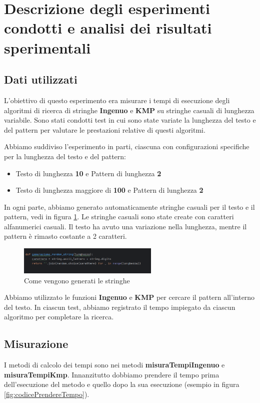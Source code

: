 \newpage
\section{Descrizione degli esperimenti condotti e analisi dei risultati sperimentali}

\subsection{Dati utilizzati}
\label{sec:DatiUtilizzati_1}
L'obiettivo di questo esperimento era misurare i tempi di esecuzione degli algoritmi di ricerca di stringhe \textbf{Ingenuo} e \textbf{KMP} su stringhe casuali di lunghezza variabile. Sono stati condotti test in cui sono state variate la lunghezza del testo e del pattern per valutare le prestazioni relative di questi algoritmi.

Abbiamo suddiviso l'esperimento in parti, ciascuna con configurazioni specifiche per la lunghezza del testo e del pattern:

\begin{itemize}
    \item Testo di lunghezza \textbf{10} e Pattern di lunghezza \textbf{2}
    \item Testo di lunghezza maggiore di \textbf{100} e Pattern di lunghezza \textbf{2}
\end{itemize}

In ogni parte, abbiamo generato automaticamente stringhe casuali per il testo e il pattern, vedi in figura \ref{fig:randomStringhe}. Le stringhe casuali sono state create con caratteri alfanumerici casuali. Il testo ha avuto una variazione nella lunghezza, mentre il pattern è rimasto costante a 2 caratteri.

\begin{figure}[H]
    \centering
    \includegraphics[width=0.6\textwidth]{Resources/generazionerandomstring.png}
    \caption{Come vengono generati le stringhe}
    \label{fig:randomStringhe}
\end{figure}

Abbiamo utilizzato le funzioni \textbf{Ingenuo} e \textbf{KMP} per cercare il pattern all'interno del testo. In ciascun test, abbiamo registrato il tempo impiegato da ciascun algoritmo per completare la ricerca.

\subsection{Misurazione}
\label{sec:Misurazioni_1}
I metodi di calcolo dei tempi sono nei metodi \textbf{misuraTempiIngenuo} e \textbf{misuraTempiKmp}. Innanzitutto dobbiamo prendere il tempo prima dell'esecuzione del metodo e quello dopo la sua esecuzione (esempio in figura \ref{fig:codicePrendereTempo}). 

